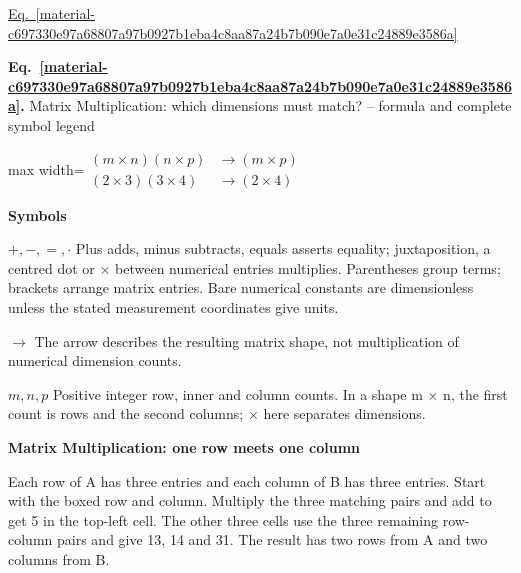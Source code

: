 \documentclass[11pt,a4paper]{article}
\begin{document}
\hyperref[material-c697330e97a68807a97b0927b1eba4c8aa87a24b7b090e7a0e31c24889e3586a]{Eq.~\ref*{material-c697330e97a68807a97b0927b1eba4c8aa87a24b7b090e7a0e31c24889e3586a}}


\par\medskip
\noindent\begin{minipage}{\linewidth}
\label{material-c697330e97a68807a97b0927b1eba4c8aa87a24b7b090e7a0e31c24889e3586a}
\noindent\textbf{Eq.~\ref*{material-c697330e97a68807a97b0927b1eba4c8aa87a24b7b090e7a0e31c24889e3586a}.} Matrix Multiplication: which dimensions must match? – formula and complete symbol legend\par\nopagebreak
\begin{center}\begin{adjustbox}{max width=\linewidth}$\displaystyle \begin{aligned}(m\times\boxed{n})(\boxed{n}\times p)&\longrightarrow(m\times p)\\(2\times\boxed{3})(\boxed{3}\times4)&\longrightarrow(2\times4)\end{aligned}$\end{adjustbox}\end{center}

\par\noindent\textbf{Symbols}

\par\noindent\textbf{\(+,-,=,\cdot\)} Plus adds, minus subtracts, equals asserts equality; juxtaposition, a centred dot or \ensuremath{\times} between numerical entries multiplies. Parentheses group terms; brackets arrange matrix entries. Bare numerical constants are dimensionless unless the stated measurement coordinates give units.

\par\noindent\textbf{\(\longrightarrow\)} The arrow describes the resulting matrix shape, not multiplication of numerical dimension counts.

\par\noindent\textbf{\(m,n,p\)} Positive integer row, inner and column counts. In a shape m \ensuremath{\times} n, the first count is rows and the second columns; \ensuremath{\times} here separates dimensions.

\end{minipage}\par
\medskip

\textbf{Matrix Multiplication: one row meets one column}


Each row of A has three entries and each column of B has three entries. Start with the boxed row and column. Multiply the three matching pairs and add to get 5 in the top-left cell. The other three cells use the three remaining row-column pairs and give 13, 14 and 31. The result has two rows from A and two columns from B.
\end{document}
